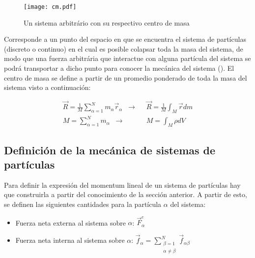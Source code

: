 \documentclass[/home/hernan/Documentos/Apuntes_mecanica_teorica/main.tex]{subfiles}
\begin{document}
    \begin{marginfigure}
        \begin{figure}[H]
            \centering
            \texttt{[image: cm.pdf]}
            \caption{Un sistema arbitrário con su respectivo centro de masa}
            \label{fig: centrodemasa}
        \end{figure}
    \end{marginfigure}

    \begin{definition}
        Corresponde a un punto del espacio en que se encuentra el sistema de partículas (discreto o continuo) en el cual es posible colapsar toda la masa del sistema, de modo que una fuerza arbitrária que interactue con alguna partícula del sistema se podrá transportar a dicho punto para conocer la mecánica del sistema (). El centro de masa se define a partir de un promedio ponderado de toda la masa del sistema visto a continuación:

        \begin{align}
            \vec{R} = \frac{1}{M} \sum_{\alpha =1}^{N} m_{\alpha} \vec{r}_{\alpha} \; \; \rightarrow  & \; \; \vec{R} = \frac{1}{M} \int_{M} \vec{r} dm \\ 
            M = \sum_{\alpha = 1}^{N} m_{\alpha} \; \; \rightarrow  & \; \; M =  \int_{M}  \rho dV
        \end{align}
        
    \end{definition}

	\subsection{Definición de la mecánica de sistemas de partículas}

	Para definir la expresión del momentum lineal de un sistema de partículas hay que construirla a partir del conocimiento de la sección anterior. A partir de esto, se definen las siguientes cantidades para la partícula $\alpha$ del sistema:

	\begin{itemize}
		\item Fuerza neta externa al sistema sobre $\alpha$: $\vec{F}_{\alpha}^{e}$ 
		\item Fuerza neta interna al sistema sobre $\alpha$: $\vec{f}_{\alpha}= \sum_{\left .\begin{matrix} \beta = 1\\ \alpha \neq \beta \end{matrix}\right .}^{N}\vec{f}_{\alpha \beta}$ 
	\end{itemize}
\end{document}
